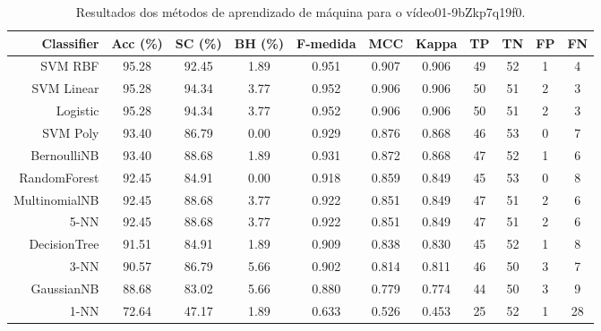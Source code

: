 \begin{table}[!htb]
\centering
\caption{Resultados dos métodos de aprendizado de máquina para o vídeo01-9bZkp7q19f0.}
\label{tab:01-9bZkp7q19f0}
\begin{tabular}{r|c|c|c|c|c|c|c|c|c|c}
\hline\hline
Classifier & Acc (\%) & SC (\%) & BH (\%) & F-medida & MCC & Kappa & TP & TN & FP & FN \\ \hline
SVM RBF & 95.28 & 92.45 & 1.89 & 0.951 & 0.907 & 0.906 & 49 & 52 & 1 & 4 \\ 
SVM Linear & 95.28 & 94.34 & 3.77 & 0.952 & 0.906 & 0.906 & 50 & 51 & 2 & 3 \\ 
Logistic & 95.28 & 94.34 & 3.77 & 0.952 & 0.906 & 0.906 & 50 & 51 & 2 & 3 \\ 
SVM Poly & 93.40 & 86.79 & 0.00 & 0.929 & 0.876 & 0.868 & 46 & 53 & 0 & 7 \\ 
BernoulliNB & 93.40 & 88.68 & 1.89 & 0.931 & 0.872 & 0.868 & 47 & 52 & 1 & 6 \\ 
RandomForest & 92.45 & 84.91 & 0.00 & 0.918 & 0.859 & 0.849 & 45 & 53 & 0 & 8 \\ 
MultinomialNB & 92.45 & 88.68 & 3.77 & 0.922 & 0.851 & 0.849 & 47 & 51 & 2 & 6 \\ 
5-NN & 92.45 & 88.68 & 3.77 & 0.922 & 0.851 & 0.849 & 47 & 51 & 2 & 6 \\ 
DecisionTree & 91.51 & 84.91 & 1.89 & 0.909 & 0.838 & 0.830 & 45 & 52 & 1 & 8 \\ 
3-NN & 90.57 & 86.79 & 5.66 & 0.902 & 0.814 & 0.811 & 46 & 50 & 3 & 7 \\ 
GaussianNB & 88.68 & 83.02 & 5.66 & 0.880 & 0.779 & 0.774 & 44 & 50 & 3 & 9 \\ 
1-NN & 72.64 & 47.17 & 1.89 & 0.633 & 0.526 & 0.453 & 25 & 52 & 1 & 28 \\ 
\hline\hline
\end{tabular}
\end{table}
